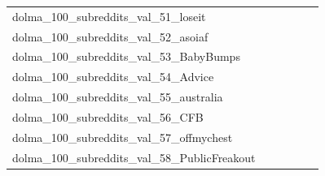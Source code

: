 \documentclass[dvipsnames]{article}
\begin{document}
\begin{appendix}
{\begin{longtable}{m{6cm}m{1.7cm}m{1.7cm}m{1.7cm}m{1.7cm}m{1.7cm}}
	dolma\_100\_subreddits\_val\_51\_loseit  & \colorbox[HTML]{ffffe5}{\makebox[\mywidth][c]{19.36}} & \colorbox[HTML]{a9db8c}{\makebox[\mywidth][c]{18.39}} & \colorbox[HTML]{ffffe5}{\makebox[\mywidth][c]{19.49}} & \colorbox[HTML]{e4f4ab}{\makebox[\mywidth][c]{18.52}} & \colorbox[HTML]{77c578}{\makebox[\mywidth][c]{18.33}}\\
	dolma\_100\_subreddits\_val\_52\_asoiaf  & \colorbox[HTML]{ffffe5}{\makebox[\mywidth][c]{25.28}} & \colorbox[HTML]{e1f3a9}{\makebox[\mywidth][c]{23.99}} & \colorbox[HTML]{ffffe5}{\makebox[\mywidth][c]{25.63}} & \colorbox[HTML]{d8efa2}{\makebox[\mywidth][c]{23.94}} & \colorbox[HTML]{77c578}{\makebox[\mywidth][c]{23.69}}\\
	dolma\_100\_subreddits\_val\_53\_BabyBumps  & \colorbox[HTML]{ffffe5}{\makebox[\mywidth][c]{20.96}} & \colorbox[HTML]{a0d789}{\makebox[\mywidth][c]{19.82}} & \colorbox[HTML]{ffffe5}{\makebox[\mywidth][c]{21.11}} & \colorbox[HTML]{d4eea0}{\makebox[\mywidth][c]{19.92}} & \colorbox[HTML]{77c578}{\makebox[\mywidth][c]{19.76}}\\
	dolma\_100\_subreddits\_val\_54\_Advice  & \colorbox[HTML]{ffffe5}{\makebox[\mywidth][c]{19.17}} & \colorbox[HTML]{c2e698}{\makebox[\mywidth][c]{18.29}} & \colorbox[HTML]{ffffe5}{\makebox[\mywidth][c]{19.35}} & \colorbox[HTML]{e5f4ab}{\makebox[\mywidth][c]{18.38}} & \colorbox[HTML]{77c578}{\makebox[\mywidth][c]{18.19}}\\
	dolma\_100\_subreddits\_val\_55\_australia  & \colorbox[HTML]{ffffe5}{\makebox[\mywidth][c]{23.97}} & \colorbox[HTML]{b6e092}{\makebox[\mywidth][c]{22.51}} & \colorbox[HTML]{ffffe5}{\makebox[\mywidth][c]{24.06}} & \colorbox[HTML]{d8efa2}{\makebox[\mywidth][c]{22.61}} & \colorbox[HTML]{77c578}{\makebox[\mywidth][c]{22.40}}\\
	dolma\_100\_subreddits\_val\_56\_CFB  & \colorbox[HTML]{ffffe5}{\makebox[\mywidth][c]{20.45}} & \colorbox[HTML]{cdeb9d}{\makebox[\mywidth][c]{19.41}} & \colorbox[HTML]{ffffe5}{\makebox[\mywidth][c]{20.92}} & \colorbox[HTML]{e1f3a9}{\makebox[\mywidth][c]{19.49}} & \colorbox[HTML]{77c578}{\makebox[\mywidth][c]{19.23}}\\
	dolma\_100\_subreddits\_val\_57\_offmychest  & \colorbox[HTML]{ffffe5}{\makebox[\mywidth][c]{19.63}} & \colorbox[HTML]{8ccf81}{\makebox[\mywidth][c]{18.79}} & \colorbox[HTML]{ffffe5}{\makebox[\mywidth][c]{19.77}} & \colorbox[HTML]{e2f3a9}{\makebox[\mywidth][c]{18.93}} & \colorbox[HTML]{77c578}{\makebox[\mywidth][c]{18.77}}\\
	dolma\_100\_subreddits\_val\_58\_PublicFreakout  & \colorbox[HTML]{ffffe5}{\makebox[\mywidth][c]{25.96}} & \colorbox[HTML]{b2df90}{\makebox[\mywidth][c]{24.49}} & \colorbox[HTML]{ffffe5}{\makebox[\mywidth][c]{26.02}} & \colorbox[HTML]{e3f4aa}{\makebox[\mywidth][c]{24.65}} & \colorbox[HTML]{77c578}{\makebox[\mywidth][c]{24.39}}\\

\end{longtable}}
\end{appendix}
\end{document}
